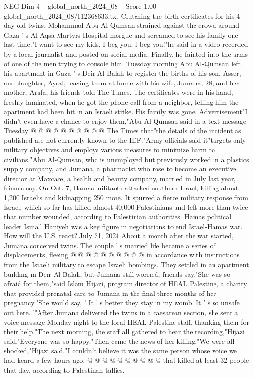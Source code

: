 \begin{textsample}{NEG Dim 4 – global\_north\_2024\_08 – Score 1.00 – global\_north\_2024\_08/112368633.txt}  \label{ex:f4_neg_305}
Clutching the birth certificates for his 4-day-old twins, Mohammad Abu Al-Qumsan strained against the crowd around Gaza ' s Al-Aqsa Martyrs Hospital morgue and screamed to see his family one last time."I want to see my kids.
I beg you.
I beg you!"he said in a video recorded by a local journalist and posted on social media.
Finally, he fainted into the arms of one of the men trying to console him.
Tuesday morning Abu Al-Qumsan left his apartment in Gaza ' s Deir Al-Balah to register the births of his son, Asser, and daughter, Aysal, leaving them at home with his wife, Jumana, 28, and her mother, Arafa, his friends told The Times.
The certificates were in his hand, freshly laminated, when he got the phone call from a neighbor, telling him the apartment had been hit in an Israeli strike.
His family was gone.
Advertisement"I didn't even have a chance to enjoy them,"Abu Al-Qumsan said in a text message Tuesday @ @ @ @ @ @ @ @ @ @ The Times that"the details of the incident as published are not currently known to the IDF."Army officials said it"targets only military objectives and employs various measures to minimize harm to civilians."Abu Al-Qumsan, who is unemployed but previously worked in a plastics supply company, and Jumana, a pharmacist who rose to become an executive director at Maxcare, a health and beauty company, married in July last year, friends say.
On Oct. 7, Hamas militants attacked southern Israel, killing about 1,200 Israelis and kidnapping 250 more.
It spurred a fierce military response from Israel, which so far has killed almost 40,000 Palestinians and left more than twice that number wounded, according to Palestinian authorities.
Hamas political leader Ismail Haniyeh was a key figure in negotiations to end Israel-Hamas war.
How will the U.S. react?
July 31, 2024 About a month after the war started, Jumana conceived twins.
The couple ' s married life became a series of displacements, fleeing @ @ @ @ @ @ @ @ @ @ in accordance with instructions from the Israeli military to escape Israeli bombings.
They settled in an apartment building in Deir Al-Balah, but Jumana still worried, friends say."She was so afraid for them,"said Islam Hijazi, program director of HEAL Palestine, a charity that provided prenatal care to Jumana in the final three months of her pregnancy."She would say, ' It ' s better they stay in my womb.
It ' s so unsafe out here. '"After Jumana delivered the twins in a caesarean section, she sent a voice message Monday night to the local HEAL Palestine staff, thanking them for their help."The next morning, the staff all gathered to hear the recording,"Hijazi said."Everyone was so happy."Then came the news of her killing."We were all shocked,"Hijazi said."I couldn't believe it was the same person whose voice we had heard a few hours ago. @ @ @ @ @ @ @ @ @ @ that killed at least 32 people that day, according to Palestinan tallies.

\end{textsample}
